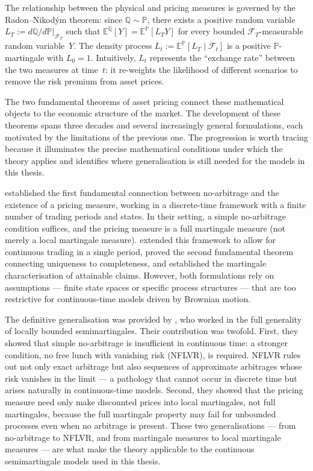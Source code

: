 The relationship between the physical and pricing measures is governed by
the Radon--Nikod\'ym theorem: since $\mathbb{Q} \sim \mathbb{P}$, there
exists a positive random variable $L_T := d\mathbb{Q}/d\mathbb{P}
|_{\mathcal{F}_T}$ such that
$\mathbb{E}^{\mathbb{Q}}[Y] = \mathbb{E}^{\mathbb{P}}[L_T Y]$ for
every bounded $\mathcal{F}_T$-measurable random variable~$Y$.  The
density process $L_t := \mathbb{E}^{\mathbb{P}}[L_T \mid \mathcal{F}_t]$
is a positive $\mathbb{P}$-martingale with $L_0 = 1$.  Intuitively, $L_t$
represents the ``exchange rate'' between the two measures at time~$t$: it
re-weights the likelihood of different scenarios to remove the risk
premium from asset prices.

The two fundamental theorems of asset pricing connect these mathematical
objects to the economic structure of the market.  The development of these
theorems spans three decades and several increasingly general
formulations, each motivated by the limitations of the previous one.  The
progression is worth tracing because it illuminates the precise
mathematical conditions under which the theory applies and identifies
where generalisation is still needed for the models in this thesis.

\citet{HarrisonKreps1979} established the first fundamental connection
between no-arbitrage and the existence of a pricing measure, working in a
discrete-time framework with a finite number of trading periods and states.
In their setting, a simple no-arbitrage condition suffices, and the pricing
measure is a full martingale measure (not merely a local martingale
measure).  \citet{HarrisonPliska1981} extended this framework to allow for
continuous trading in a single period, proved the second fundamental
theorem connecting uniqueness to completeness, and established the
martingale characterisation of attainable claims.  However, both
formulations rely on assumptions --- finite state spaces or specific
process structures --- that are too restrictive for continuous-time
models driven by Brownian motion.

The definitive generalisation was provided by
\citet{DelbaenSchachermayer1994}, who worked in the full generality of
locally bounded semimartingales.  Their contribution was twofold.  First,
they showed that simple no-arbitrage is insufficient in continuous time: a
stronger condition, no free lunch with vanishing risk (NFLVR), is
required.  NFLVR rules out not only exact arbitrage but also sequences of
approximate arbitrages whose risk vanishes in the limit --- a pathology
that cannot occur in discrete time but arises naturally in
continuous-time models.  Second, they showed that the pricing measure need
only make discounted prices into local martingales, not full
martingales, because the full martingale property may fail for unbounded
processes even when no arbitrage is present.  These two generalisations
--- from no-arbitrage to NFLVR, and from martingale measures to local
martingale measures --- are what make the theory applicable to the
continuous semimartingale models used in this thesis.

